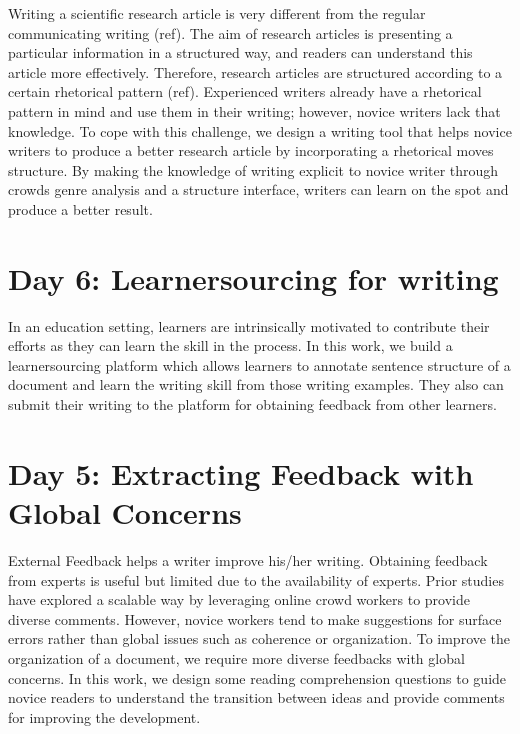 \documentclass[a4paper]{article}
\begin{document}
Writing a scientific research article is very different from the regular communicating writing (ref). The aim of research articles is presenting a particular information in a structured way, and readers can understand this article more effectively. Therefore, research articles are structured according to a certain rhetorical pattern (ref). Experienced writers already have a rhetorical pattern in mind and use them in their writing; however, novice writers lack that knowledge. To cope with this challenge, we design a writing tool that helps novice writers to produce a better research article by incorporating a rhetorical moves structure. By making the knowledge of writing explicit to novice writer through crowds genre analysis and a structure interface, writers can learn on the spot and produce a better result. 

\section{Day 6: Learnersourcing for writing}
In an education setting, learners are intrinsically motivated to contribute their efforts as they can learn the skill in the process. In this work, we build a learnersourcing platform which allows learners to annotate sentence structure of a document and learn the writing skill from those writing examples. They also can submit their writing to the platform for obtaining feedback from other learners. 

\section{Day 5: Extracting Feedback with Global Concerns}
External Feedback helps a writer improve his/her writing. Obtaining feedback from experts is useful but limited due to the availability of experts. Prior studies have explored a scalable way by leveraging online crowd workers to provide diverse comments. However, novice workers tend to make suggestions for surface errors rather than global issues such as coherence or organization. To improve the organization of a document, we require more diverse feedbacks with global concerns. In this work, we design some reading comprehension questions to guide novice readers to understand the transition between ideas and provide comments for improving the development.
\end{document}
